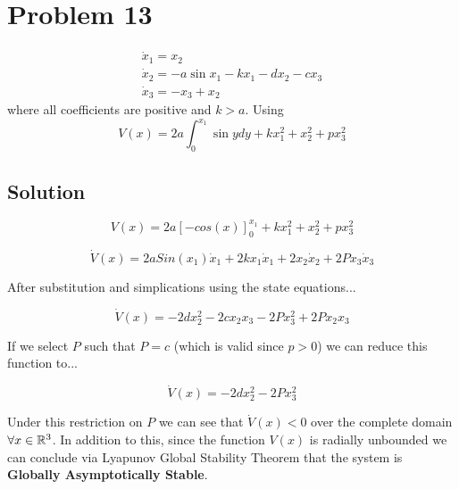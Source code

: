\section*{Problem 13}

$$
\begin{array}{l}
\dot{x}_{1}=x_{2} \\
\dot{x}_{2}=-a \sin x_{1}-k x_{1}-d x_{2}-c x_{3} \\
\dot{x}_{3}=-x_{3}+x_{2}
\end{array}
$$
where all coefficients are positive and $k>a$. Using
$$
V(x)=2 a \int_{0}^{x_{1}} \sin y d y+k x_{1}^{2}+x_{2}^{2}+p x_{3}^{2}
$$



\subsection*{Solution}

$$
V(x) = 2a[ -cos(x)]_0^{x_1} + kx_1^2 + x_2^2 + px_3^2
$$

$$
\dot{V}(x) = 2aSin(x_1)\dot{x}_1 + 2kx_1\dot{x}_1 + 2x_2\dot{x}_2 + 2Px_3\dot{x}_3
$$


\noindent After substitution and simplications using the state equations...

$$
\dot{V}(x) = - 2dx_2^2 -2cx_2x_3 - 2Px_3^2 + 2Px_2x_3
$$


\noindent If we select $P$ such that $P=c$ (which is valid since $p>0$) we can reduce this function to...

$$
\dot{V}(x) = - 2dx_2^2 - 2Px_3^2
$$

\noindent Under this restriction on $P$ we can see that $\dot{V}(x)<0$ over the complete domain $\forall x \in \mathbb{R}^3$. In addition to this, since the function $V(x)$ is radially unbounded we can conclude via Lyapunov Global Stability Theorem that the system is \textbf{Globally Asymptotically Stable}.
